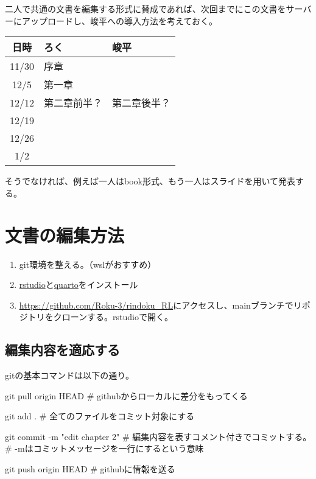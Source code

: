 \documentclass[
  letterpaper,
  DIV=11,
  numbers=noendperiod]{scrreprt}
\newenvironment{Shaded}{\begin{snugshade}}{\end{snugshade}}
\newcommand{\AttributeTok}[1]{\textcolor[rgb]{0.40,0.45,0.13}{#1}}
\newcommand{\CommentTok}[1]{\textcolor[rgb]{0.37,0.37,0.37}{#1}}
\newcommand{\FunctionTok}[1]{\textcolor[rgb]{0.28,0.35,0.67}{#1}}
\newcommand{\NormalTok}[1]{\textcolor[rgb]{0.00,0.23,0.31}{#1}}
\newcommand{\StringTok}[1]{\textcolor[rgb]{0.13,0.47,0.30}{#1}}
\providecommand{\tightlist}{%
  \setlength{\itemsep}{0pt}\setlength{\parskip}{0pt}}\usepackage{longtable,booktabs,array}
\begin{document}
二人で共通の文書を編集する形式に賛成であれば、次回までにこの文書をサーバーにアップロードし、峻平への導入方法を考えておく。

\begin{longtable}[]{@{}cll@{}}
\toprule()
日時 & ろく & 峻平 \\
\midrule()
\endhead
11/30 & 序章 & \\
12/5 & 第一章 & \\
12/12 & 第二章前半？ & 第二章後半？ \\
12/19 & & \\
12/26 & & \\
1/2 & & \\
\bottomrule()
\end{longtable}

そうでなければ、例えば一人はbook形式、もう一人はスライドを用いて発表する。

\hypertarget{ux6587ux66f8ux306eux7de8ux96c6ux65b9ux6cd5}{%
\section{文書の編集方法}\label{ux6587ux66f8ux306eux7de8ux96c6ux65b9ux6cd5}}

\begin{enumerate}
\def\labelenumi{\arabic{enumi}.}
\tightlist
\item
  git環境を整える。（wslがおすすめ）
\item
  \href{https://posit.co/download/rstudio-desktop/}{rstudio}と\href{https://quarto.org/docs/get-started/}{quarto}をインストール
\item
  \url{https://github.com/Roku-3/rindoku_RL}にアクセスし、mainブランチでリポジトリをクローンする。rstudioで開く。
\end{enumerate}

\hypertarget{ux7de8ux96c6ux5185ux5bb9ux3092ux9069ux5fdcux3059ux308b}{%
\subsection{編集内容を適応する}\label{ux7de8ux96c6ux5185ux5bb9ux3092ux9069ux5fdcux3059ux308b}}

gitの基本コマンドは以下の通り。

\begin{Shaded}
\begin{Highlighting}[]
\FunctionTok{git}\NormalTok{ pull origin HEAD            }\CommentTok{\# githubからローカルに差分をもってくる}

\FunctionTok{git}\NormalTok{ add .                       }\CommentTok{\# 全てのファイルをコミット対象にする}

\FunctionTok{git}\NormalTok{ commit }\AttributeTok{{-}m} \StringTok{"edit chapter 2"}  \CommentTok{\# 編集内容を表すコメント付きでコミットする。}
                                \CommentTok{\# {-}mはコミットメッセージを一行にするという意味}
                                
\FunctionTok{git}\NormalTok{ push origin HEAD            }\CommentTok{\# githubに情報を送る}
\end{Highlighting}
\end{Shaded}
\end{document}

